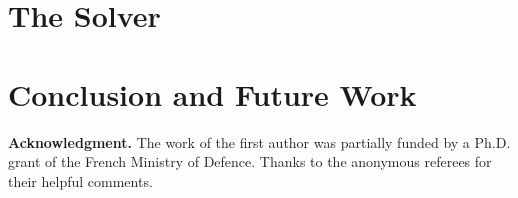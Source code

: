 \documentclass[EPiC]{easychair}
\begin{document}
\section{The Solver}
\label{sect:solver}



\section{Conclusion and Future Work}
\label{sect:discussion}


\noindent\textbf{Acknowledgment.} 
The work of the first author was partially funded by a Ph.D. grant of
the French Ministry of Defence. Thanks to the anonymous referees 
for their helpful comments.
\end{document}
